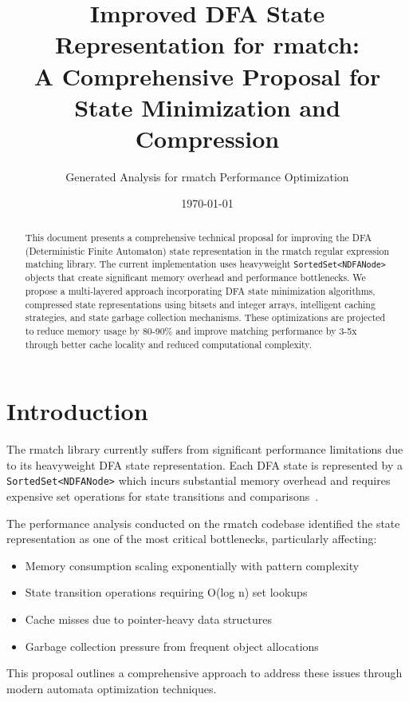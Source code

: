 \documentclass[11pt,a4paper]{article}
\title{Improved DFA State Representation for rmatch:\\
A Comprehensive Proposal for State Minimization and Compression}
\author{Generated Analysis for rmatch Performance Optimization}
\date{\today}
\begin{document}
\maketitle

\begin{abstract}
This document presents a comprehensive technical proposal for improving the DFA (Deterministic Finite Automaton) state representation in the rmatch regular expression matching library. The current implementation uses heavyweight \texttt{SortedSet<NDFANode>} objects that create significant memory overhead and performance bottlenecks. We propose a multi-layered approach incorporating DFA state minimization algorithms, compressed state representations using bitsets and integer arrays, intelligent caching strategies, and state garbage collection mechanisms. These optimizations are projected to reduce memory usage by 80-90\% and improve matching performance by 3-5x through better cache locality and reduced computational complexity.
\end{abstract}

\section{Introduction}

The rmatch library currently suffers from significant performance limitations due to its heavyweight DFA state representation. Each DFA state is represented by a \texttt{SortedSet<NDFANode>} which incurs substantial memory overhead and requires expensive set operations for state transitions and comparisons~\cite{hopcroft2001introduction}.

The performance analysis conducted on the rmatch codebase identified the state representation as one of the most critical bottlenecks, particularly affecting:
\begin{itemize}
    \item Memory consumption scaling exponentially with pattern complexity
    \item State transition operations requiring O(log n) set lookups
    \item Cache misses due to pointer-heavy data structures
    \item Garbage collection pressure from frequent object allocations
\end{itemize}

This proposal outlines a comprehensive approach to address these issues through modern automata optimization techniques.
\end{document}

